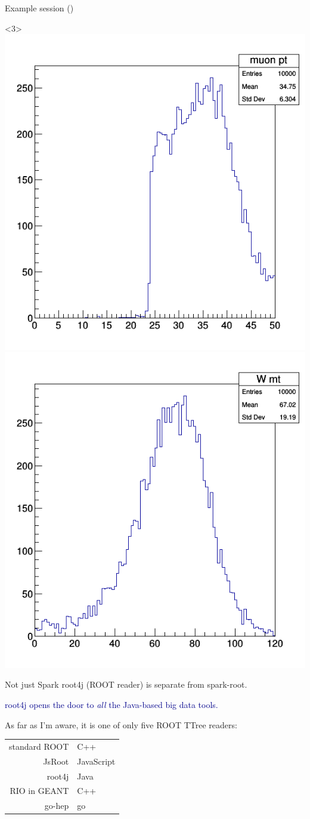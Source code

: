 \documentclass{beamer}
\begin{document}
\begin{frame}[fragile]{Example session ()}
\vspace{-3.1 cm}
\begin{uncoverenv}<3>
\mbox{ } \hfill \includegraphics[width=3 cm]{muonpt.png}\includegraphics[width=3 cm]{wmt.png}
\end{uncoverenv}
\end{frame}

\begin{frame}{Not just Spark}
\vspace{0.5 cm}
root4j (ROOT reader) is separate from spark-root.

\vfill
\textcolor{darkblue}{root4j opens the door to {\it all} the Java-based big data tools.}

\vfill
As far as I'm aware, it is one of only five ROOT TTree readers:
\begin{center}
\renewcommand{\arraystretch}{1.2}
\begin{tabular}{r | l}
standard ROOT & C++ \\
JsRoot        & JavaScript\hspace{0.75 cm} \\
root4j        & Java \\
RIO in GEANT  & C++ \\
go-hep        & go
\end{tabular}
\end{center}
\end{frame}
\end{document}

